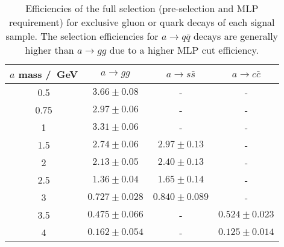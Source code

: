 \documentclass[NOTE, atlasdraft=true, texlive=2017, UKenglish]{\ATLASLATEXPATH atlasdoc}
\begin{document}
\begin{table}[!htbp]{\footnotesize\renewcommand{\arraystretch}{1.2} %
  \begin{center}
    \footnotesize
    \begin{tabular}{|c|ccc|}
      \hline
      $a$ mass /~GeV & $a\to gg$ & $a\to s\bar s$ & $a\to c\bar c$ \\
      \hline
      0.5 & $3.66 \pm 0.08$ & - & - \\
      0.75 & $2.97 \pm 0.06$ & - & - \\
      1 & $3.31 \pm 0.06$ & - & - \\
      1.5 & $2.74 \pm 0.06$ & $2.97 \pm 0.13$ & - \\
      2 & $2.13 \pm 0.05$ & $2.40 \pm 0.13$ & - \\
      2.5 & $1.36 \pm 0.04$ & $1.65 \pm 0.14$ & - \\
      3 & $0.727 \pm 0.028$ & $0.840 \pm 0.089$ & - \\
      3.5 & $0.475 \pm 0.066$ & - & $0.524 \pm 0.023$ \\
      4 & $0.162 \pm 0.054$ & - & $0.125 \pm 0.014$ \\
      \hline
    \end{tabular}
    \caption{Efficiencies of the full selection (pre-selection and MLP requirement) for exclusive gluon or quark decays of each signal sample. The selection efficiencies for $a\to q\bar q$ decays are generally higher than $a\to gg$ due to a higher MLP cut efficiency.}
    \label{tab:modelindependentefficiencies}
  \end{center}}
\end{table}

\end{document}
